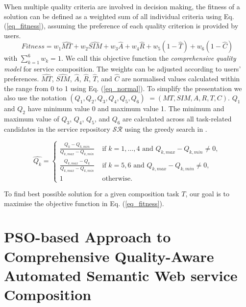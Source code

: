 When multiple quality criteria are involved in decision making, the fitness of a solution can be defined as a weighted sum of all individual criteria using Eq. (\ref{eq_fitness}), assuming the preference of each quality criterion is provided by users.
\begin{equation}
\label{eq_fitness}
Fitness = w_1 \hat{MT} + w_2 \hat{SIM} + w_3 \hat{A} + w_4 \hat{R} + w_5(1 - \hat{T}) + w_6(1 - \hat{C})
\end{equation}
\noindent with $\sum_{k=1}^{6} w_k= 1$. We call this objective function the \emph{comprehensive quality model} for service composition.
The weights can be adjusted according to users' preferences. $\hat{MT}$, $\hat{SIM}$, $\hat{A}$, $\hat{R}$, $\hat{T}$, and $\hat{C}$ are normalised values calculated within the range from 0 to 1 using Eq. (\ref{eq_normal}). To simplify the presentation we also use the notation $(Q_1,Q_2,Q_3,Q_4,Q_5,Q_6) $ $= (MT,SIM,A,R,T,C)$. $Q_1$ and $Q_2$ have minimum value 0 and maximum value 1. The minimum and maximum value of $Q_3$, $Q_4$, $Q_5$, and $Q_6$ are calculated across all task-related candidates in the service repository $\mathcal{SR}$ using the greedy search in \cite{ma2015hybrid,da2016genetic}.

\begin{equation}
\label{eq_normal}
\hat{Q_k} = 
\begin{cases}
	\frac{Q_k - Q_{k, min}}{Q_{k, max} - Q_{k, min}} & \text{ if $k=1,\ldots,4$ and }Q_{k, max} - Q_{k, min} \neq 0,\\
	\frac{Q_{k,max} - Q_k}{Q_{k, max} - Q_{k, min}} & \text{ if $k=5,6$ and }Q_{k, max} - Q_{k, min} \neq 0,\\
	1 & \text{ otherwise}.
\end{cases}
\end{equation}

\noindent To find best possible solution for a given composition task $T$, our goal is to maximise the objective function in Eq. (\ref{eq_fitness}).


\section{PSO-based Approach to Comprehensive Quality-Aware Automated Semantic Web service Composition}\label{qswsc_approach}
